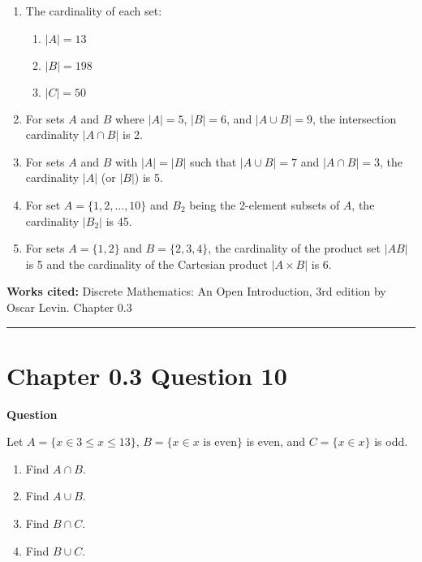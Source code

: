 \documentclass{article}
\begin{document}
\begin{enumerate}
    \item The cardinality of each set:
    \begin{enumerate}
        \item \( |A| = 13 \)
        \item \( |B| = 198 \)
        \item \( |C| = 50 \)
    \end{enumerate}
    
    \item For sets \( A \) and \( B \) where \( |A| = 5 \), \( |B| = 6 \), and \( |A \cup B| = 9 \), the intersection cardinality \( |A \cap B| \) is 2.
    
    \item For sets \( A \) and \( B \) with \( |A| = |B| \) such that \( |A \cup B| = 7 \) and \( |A \cap B| = 3 \), the cardinality \( |A| \) (or \( |B| \)) is 5.
    
    \item For set \( A = \{1, 2, \ldots, 10\} \) and \( B_2 \) being the 2-element subsets of \( A \), the cardinality \( |B_2| \) is 45.
    
    \item For sets \( A = \{1, 2\} \) and \( B = \{2, 3, 4\} \), the cardinality of the product set \( |AB| \) is 5 and the cardinality of the Cartesian product \( |A \times B| \) is 6.
\end{enumerate}

\vspace{0.5cm}
\textbf{Works cited:}
Discrete Mathematics: An Open Introduction, 3rd edition by Oscar Levin. Chapter 0.3

\vspace{0.5cm}
\hrule
\vspace{0.5cm}

\section*{Chapter 0.3 Question 10} 

\textbf{Question}

Let $A = \{x \in 3 \le x \le 13\}$, $B = \{x \in x \mbox{ is even} \}$ is even, and $C = \{x \in x \} $ is odd.

\begin{enumerate}
    \item Find $A \cap B$.
    
    \item Find $A \cup B$.

    \item Find $B \cap C$.

    \item Find $B \cup C$.
\end{enumerate}
\end{document}
